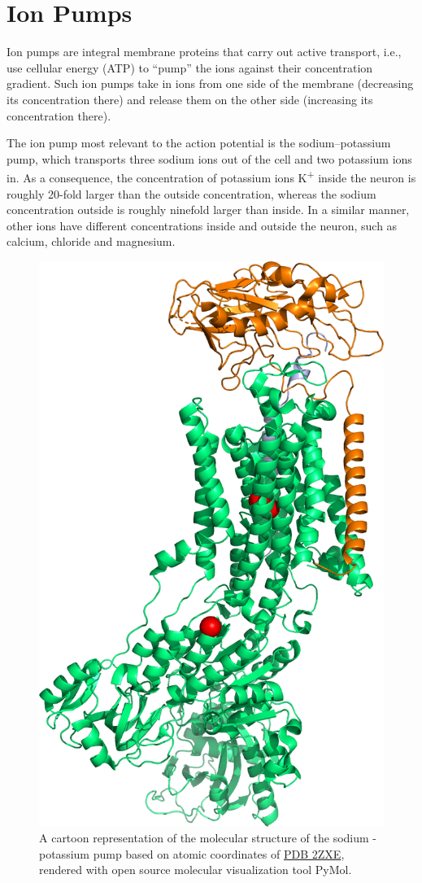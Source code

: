 \hypertarget{ion-pumps}{%
\section{Ion Pumps}\label{ion-pumps}}

Ion pumps are integral membrane proteins that carry out active transport, i.e., use cellular energy (ATP) to ``pump'' the ions against their concentration gradient. Such ion pumps take in ions from one side of the membrane (decreasing its concentration there) and release them on the other side (increasing its concentration there).

The ion pump most relevant to the action potential is the sodium--potassium pump, which transports three sodium ions out of the cell and two potassium ions in. As a consequence, the concentration of potassium ions K\textsuperscript{+} inside the neuron is roughly 20-fold larger than the outside concentration, whereas the sodium concentration outside is roughly ninefold larger than inside. In a similar manner, other ions have different concentrations inside and outside the neuron, such as calcium, chloride and magnesium.



\begin{figure}

{\centering \includegraphics[width=0.7\linewidth]{./figures/potential/Na_K_pump} 

}

\caption{A cartoon representation of the molecular structure of the sodium - potassium pump based on atomic coordinates of \href{https://www.rcsb.org/structure/2ZXE}{PDB 2ZXE}, rendered with open source molecular visualization tool PyMol.}\label{fig:nakpump}
\end{figure}

